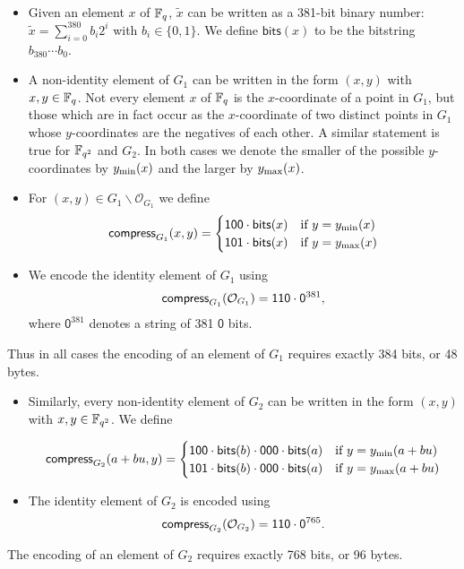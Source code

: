 \begin{itemize}

\item Given an element $x$ of $\mathbb{F}_q$, $\tilde{x}$ can be written as a 381-bit
binary number: $\tilde{x} = \sum_{i=0}^{380}b_i2^i$ with $b_i \in \{0,1\}$.  We
define $\mathsf{bits}(x)$ to be the bitstring $b_{380}\cdots b_0$.

\item A non-identity element of $G_1$ can be written in the form $(x,y)$ with $x,y\in\mathbb{F}_q$.
Not every element $x$ of $\mathbb{F}_q$ is the $x$-coordinate of a point in $G_1$, but
those which are in fact occur as the $x$-coordinate of two distinct points in
$G_1$ whose $y$-coordinates are the negatives of each other.  A similar
statement is true for $\mathbb{F}_{q^2}$ and $G_2$.  In both cases we denote the smaller of
the possible $y$-coordinates by $y_{\text{min}}(x)$ and the larger by $y_{\text{max}}(x)$.

\item For $(x,y) \in G_1\backslash \mathcal{O}_{G_1}$ we define
$$
\mathsf{compress}_{G_1} (x,y) = \begin{cases}
\mathsf{1}\mathsf{0}\mathsf{0}\cdot\mathsf{bits}(x) & \text{if $y=y_{\text{min}}(x)$}\\
\mathsf{1}\mathsf{0}\mathsf{1}\cdot\mathsf{bits}(x) & \text{if $y=y_{\text{max}}(x)$}\\
\end{cases}
$$
\item We encode the identity element of $G_1$ using
$$
\mathsf{compress}_{G_1}(\mathcal{O}_{G_1}) = \mathsf{1}\mathsf{1}\mathsf{0}\cdot\mathsf{0}^{381},
$$
\noindent where $\mathsf{0}^{381}$ denotes a string of 381 $\mathsf{0}$ bits.
\end{itemize}
\noindent Thus in all cases the encoding of an element of $G_1$ requires exactly 384 bits,
or 48 bytes.

\medskip 

\noindent 
\begin{itemize}
\item Similarly, every non-identity element of $G_2$ can be written
in the form $(x,y)$ with $x,y \in \mathbb{F}_{q^2}$.  We define

$$
\mathsf{compress}_{G_2} (a+bu,y) = \begin{cases}
\mathsf{1}\mathsf{0}\mathsf{0}\cdot\mathsf{bits}(b)\cdot\mathsf{0}\mathsf{0}\mathsf{0}\cdot\mathsf{bits}(a)
& \text{if $y=y_{\text{min}}(a+bu)$}\\
\mathsf{1}\mathsf{0}\mathsf{1}\cdot\mathsf{bits}(b)\cdot\mathsf{0}\mathsf{0}\mathsf{0}\cdot\mathsf{bits}(a) &
 \text{if $y=y_{\text{max}}(a+bu)$}\\
\end{cases}
$$

\item The identity element of $G_2$ is encoded using
$$
\mathsf{compress}_{G_2}(\mathcal{O}_{G_2}) = \mathsf{1}\mathsf{1}\mathsf{0}\cdot\mathsf{0}^{765}.
$$

\end{itemize}
\noindent The encoding of an element of $G_2$ requires exactly 768 bits, or 96 bytes.

